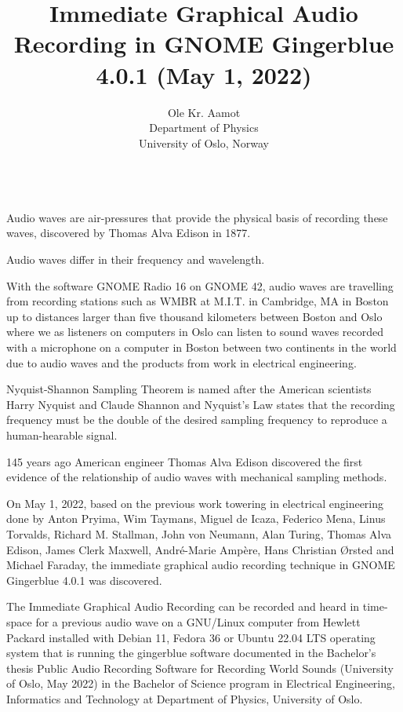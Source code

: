 \documentclass[a4paper]{article}
\author{Ole Kr. Aamot\\
  Department of Physics\\
  University of Oslo, Norway}
\title{Immediate Graphical Audio Recording in GNOME Gingerblue 4.0.1 (May 1, 2022)}
\begin{document}
\maketitle

\\

Audio waves are air-pressures that provide the physical basis of recording
these waves, discovered by Thomas Alva Edison in 1877.

Audio waves differ in their frequency and wavelength.

With the software GNOME Radio 16 on GNOME 42, audio waves are travelling from
recording stations such as WMBR at M.I.T. in Cambridge, MA in Boston up to
distances larger than five thousand kilometers between Boston and Oslo
where we as listeners on computers in Oslo can listen to sound waves
recorded with a microphone on a computer in Boston between two
continents in the world due to audio waves and the products
from work in electrical engineering.

Nyquist-Shannon Sampling Theorem is named after the American scientists
Harry Nyquist and Claude Shannon and Nyquist's Law states that the
recording frequency must be the double of the desired sampling
frequency to reproduce a human-hearable signal.

145 years ago American engineer Thomas Alva Edison discovered the first 
evidence of the relationship of audio waves with mechanical sampling methods.

On May 1, 2022, based on the previous work towering in electrical
engineering done by Anton Pryima, Wim Taymans, Miguel de Icaza,
Federico Mena, Linus Torvalds, Richard M. Stallman, John von Neumann,
Alan Turing, Thomas Alva Edison, James Clerk Maxwell, Andr\'e-Marie Amp\`ere, Hans
Christian \O{}rsted and Michael Faraday, the immediate graphical
audio recording technique in GNOME Gingerblue 4.0.1 was discovered.

The Immediate Graphical Audio Recording can be recorded and heard in
time-space for a previous audio wave on a GNU/Linux computer from
Hewlett Packard installed with Debian 11, Fedora 36 or Ubuntu 22.04
LTS operating system that is running the gingerblue software
documented in the Bachelor's thesis Public Audio Recording Software
for Recording World Sounds (University of Oslo, May 2022) in the
Bachelor of Science program in Electrical Engineering, Informatics and
Technology at Department of Physics, University of Oslo.
\end{document}

